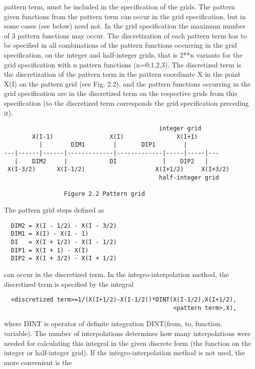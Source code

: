 pattern term, must be included in  the specification  of the  grids. The
pattern  given  functions  from  the  pattern term can occur in the grid
specification, but in some cases  (see  below)  need  not.  In  the grid
specification the  maximum number  of 3 pattern functions may occur. The
discretization  of  each  pattern  term  has  to  be  specified  in  all
combinations   of   the   pattern   functions   occurring  in  the  grid
specification, on the  integer  and  half-integer  grids,  that  is 2**n
variants   for   the   grid   specification  with  n  pattern  functions
(n=0,1,2,3). The discretized term is the  discretization of  the pattern
term in  the pattern  coordinate X in the point X(I) on the pattern grid
(see  Fig.  2.2),  and  the  pattern  functions  occurring  in  the grid
specification are  in the  discretized term on the respective grids from
this  specification  (to  the  discretized  term  corresponds  the  grid
specification preceding it).
\begin{verbatim}
                                            integer grid
        X(I-1)                X(I)               X(I+1)
          |        DIM1        |       DIP1        |
---|------|------|-------------|-------------|-----|-----|---
   |    DIM2     |            DI             |    DIP2   |
 X(I-3/2)      X(I-1/2)                    X(I+1/2)     X(I+3/2)
                                            half-integer grid

                 Figure 2.2 Pattern grid
\end{verbatim}
The pattern grid steps defined as
\begin{verbatim}
  DIM2 = X(I - 1/2) - X(I - 3/2)
  DIM1 = X(I) - X(I - 1)
  DI   = X(I + 1/2) - X(I - 1/2)
  DIP1 = X(I + 1) - X(I)
  DIP2 = X(I + 3/2) - X(I + 1/2)
\end{verbatim}
can occur in the discretized term.
     In  the  integro-interpolation  method,  the  discretized  term  is
specified by the integral
\begin{verbatim}
  <discretized term>=1/(X(I+1/2)-X(I-1/2))*DINT(X(I-1/2),X(I+1/2),
                                                <pattern term>,X),
\end{verbatim}
where DINT is operator of definite integration DINT(from,  to, function,
variable).   The   number   of   interpolations   determines   how  many
interpolations were needed for  calculating this  integral in  the given
discrete form (the function on the integer or half-integer grid). If the
integro-interpolation method is not used,  the  more  convenient  is the
